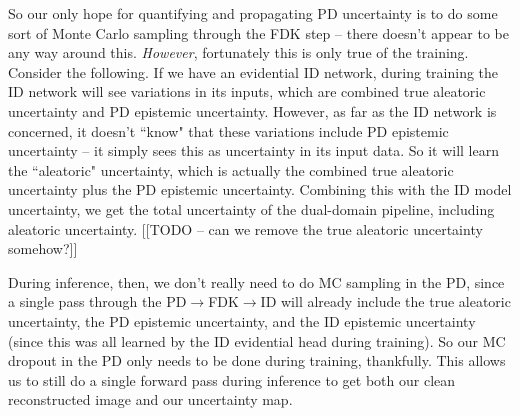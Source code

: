 \documentclass{article}
\newcommand{\0}{\varnothing}
\theoremstyle{definition}
\begin{document}
So our only hope for quantifying and propagating PD uncertainty is to do some sort of Monte Carlo sampling through the FDK step -- there doesn't appear to be any way around this. \textit{However}, fortunately this is only true of the training. Consider the following. If we have an evidential ID network, during training the ID network will see variations in its inputs, which are combined true aleatoric uncertainty and PD epistemic uncertainty. However, as far as the ID network is concerned, it doesn't ``know" that these variations include PD epistemic uncertainty -- it simply sees this as uncertainty in its input data. So it will learn the ``aleatoric" uncertainty, which is actually the combined true aleatoric uncertainty plus the PD epistemic uncertainty. Combining this with the ID model uncertainty, we get the total uncertainty of the dual-domain pipeline, including aleatoric uncertainty. [[TODO -- can we remove the true aleatoric uncertainty somehow?]]

During inference, then, we don't really need to do MC sampling in the PD, since a single pass through the PD$\to$FDK$\to$ID will already include the true aleatoric uncertainty, the PD epistemic uncertainty, and the ID epistemic uncertainty (since this was all learned by the ID evidential head during training). So our MC dropout in the PD only needs to be done during training, thankfully. This allows us to still do a single forward pass during inference to get both our clean reconstructed image and our uncertainty map.
\end{document}
